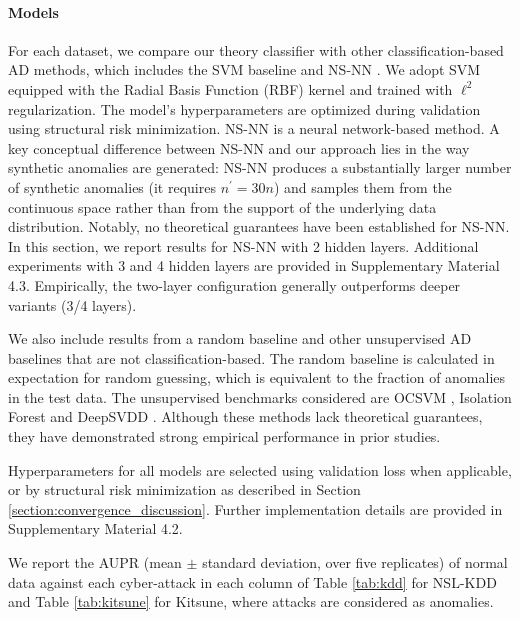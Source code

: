 \documentclass{article}
\begin{document}
\paragraph*{Models}
For each dataset, we compare our theory classifier with other classification-based AD methods, which includes the SVM baseline  and NS-NN \citep{sipple20NSNN}.
We adopt SVM equipped with the Radial Basis Function (RBF) kernel and trained with $\ell^2$ regularization. The model’s hyperparameters are optimized during validation using structural risk minimization.
NS-NN is a neural network-based method.
A key conceptual difference between NS-NN and our approach lies in the way synthetic anomalies are generated: NS-NN produces a substantially larger number of synthetic anomalies (it requires $n^\prime = 30n$) and samples them from the continuous space rather than from the support of the underlying data distribution. Notably, no theoretical guarantees have been established for NS-NN.
In this section, we report results for NS-NN with 2 hidden layers. Additional experiments with 3 and 4 hidden layers are provided in Supplementary Material 4.3. Empirically, the two-layer configuration generally outperforms deeper variants (3/4 layers).


We also include results from a random baseline and other unsupervised AD baselines that are not classification-based.
The random baseline is calculated in expectation for random guessing, which is equivalent to the fraction of anomalies in the test data.
The unsupervised benchmarks considered are OCSVM \citep{ocsvm}, Isolation Forest \citep{IsolationForest} and DeepSVDD \citep{deep_svdd}. Although these methods lack theoretical guarantees, they have demonstrated strong empirical performance in prior studies. 

Hyperparameters for all models are selected using validation loss when applicable, or by structural risk minimization as described in Section \ref{section:convergence_discussion}. Further implementation details are provided in Supplementary Material 4.2.


We report the AUPR (mean $\pm$ standard deviation, over five replicates) of normal data against each cyber-attack in each column of Table \ref{tab:kdd} for NSL-KDD and Table \ref{tab:kitsune} for Kitsune, where attacks are considered as anomalies.

\end{document}
